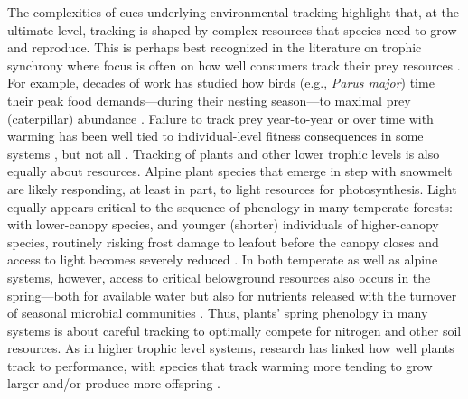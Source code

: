 \documentclass[11pt,letterpaper]{article}
\begin{document}
The complexities of cues underlying environmental tracking highlight that, at the ultimate level, tracking is shaped by complex resources that species need to grow and reproduce. This is perhaps best recognized in the literature on trophic synchrony where focus is often on how well consumers track their prey resources \citep{deacy2018,kharouba2018}. For example, decades of work has studied how birds (e.g., \emph{Parus major}) time their peak food demands---during their nesting season---to maximal prey (caterpillar) abundance \citep[e.g.,][]{charm2008}. Failure to track prey year-to-year or over time with warming has been well tied to individual-level fitness consequences in some systems \citep{charm2008}, but not all \citep{visser2006}. Tracking of plants and other lower trophic levels is also equally about resources. Alpine plant species that emerge in step with snowmelt are likely responding, at least in part, to light resources for photosynthesis. Light equally appears critical to the sequence of phenology in many temperate forests: with lower-canopy species, and younger (shorter) individuals of higher-canopy species, routinely risking frost damage to leafout before the canopy closes and access to light becomes severely reduced \citep{Vitasse2013,heberling2019}. In both temperate as well as alpine systems, however, access to critical belowground resources also occurs in the spring---both for available water but also for nutrients released with the turnover of seasonal microbial communities \citep{Zak:1990ar}. Thus, plants' spring phenology in many systems is about careful tracking to optimally compete for nitrogen and other soil resources. As in higher trophic level systems, research has linked how well plants track to performance, with species that track warming more tending to grow larger and/or produce more offspring \citep{Cleland:2012}.
\end{document}

